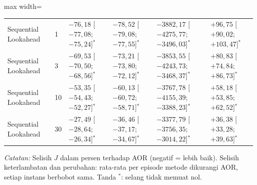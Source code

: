 \begin{table}[htbp]
\begin{adjustbox}{max width=\textwidth}
\begin{tabular}{llllll}
Sequential Lookahead & 1 & $-76{,}18$ [$-77{,}08$; $-75{,}24$]$^{*}$ & $-78{,}52$ [$-79{,}08$; $-77{,}55$]$^{*}$ & $-3882{,}17$ [$-4275{,}77$; $-3496{,}03$]$^{*}$ & $+96{,}75$ [$+90{,}02$; $+103{,}47$]$^{*}$ \\
Sequential Lookahead & 3 & $-69{,}53$ [$-70{,}50$; $-68{,}56$]$^{*}$ & $-73{,}21$ [$-73{,}80$; $-72{,}12$]$^{*}$ & $-3853{,}55$ [$-4243{,}73$; $-3468{,}37$]$^{*}$ & $+80{,}83$ [$+74{,}84$; $+86{,}73$]$^{*}$ \\
Sequential Lookahead & 10 & $-53{,}35$ [$-54{,}43$; $-52{,}27$]$^{*}$ & $-60{,}13$ [$-60{,}72$; $-58{,}71$]$^{*}$ & $-3767{,}78$ [$-4155{,}39$; $-3388{,}23$]$^{*}$ & $+58{,}18$ [$+53{,}85$; $+62{,}52$]$^{*}$ \\
Sequential Lookahead & 30 & $-27{,}49$ [$-28{,}64$; $-26{,}34$]$^{*}$ & $-36{,}46$ [$-37{,}17$; $-34{,}67$]$^{*}$ & $-3377{,}79$ [$-3756{,}35$; $-3014{,}22$]$^{*}$ & $+36{,}38$ [$+33{,}28$; $+39{,}63$]$^{*}$ \\
\bottomrule
\end{tabular}
\end{adjustbox}
\par\smallskip\footnotesize\textit{Catatan:} Selisih $J$ dalam persen terhadap AOR (negatif = lebih baik). Selisih keterlambatan dan perubahan: rata-rata per episode metode dikurangi AOR, setiap instans berbobot sama. Tanda $^{*}$: selang tidak memuat nol.
\end{table}
